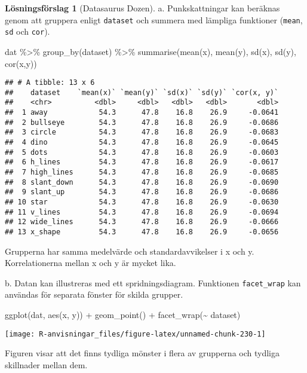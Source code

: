 \documentclass[
]{book}
\newenvironment{Shaded}{\begin{snugshade}}{\end{snugshade}}
\newcommand{\FunctionTok}[1]{\textcolor[rgb]{0.00,0.00,0.00}{#1}}
\newcommand{\NormalTok}[1]{#1}
\newcommand{\SpecialCharTok}[1]{\textcolor[rgb]{0.00,0.00,0.00}{#1}}
\theoremstyle{definition}
\theoremstyle{definition}
\theoremstyle{definition}
\theoremstyle{definition}
\newtheorem{hypothesis}{Lösningsförslag}[chapter]
\theoremstyle{remark}
\begin{document}
\begin{hypothesis}[Datasaurus Dozen]
a. Punkskattningar kan beräknas genom att gruppera enligt \texttt{dataset} och summera med lämpliga funktioner (\texttt{mean}, \texttt{sd} och \texttt{cor}).

\begin{Shaded}
\begin{Highlighting}[]
\NormalTok{dat }\SpecialCharTok{\%\textgreater{}\%}
  \FunctionTok{group\_by}\NormalTok{(dataset) }\SpecialCharTok{\%\textgreater{}\%} 
  \FunctionTok{summarise}\NormalTok{(}\FunctionTok{mean}\NormalTok{(x), }\FunctionTok{mean}\NormalTok{(y), }\FunctionTok{sd}\NormalTok{(x), }\FunctionTok{sd}\NormalTok{(y), }\FunctionTok{cor}\NormalTok{(x,y))}
\end{Highlighting}
\end{Shaded}

\begin{verbatim}
## # A tibble: 13 x 6
##    dataset    `mean(x)` `mean(y)` `sd(x)` `sd(y)` `cor(x, y)`
##    <chr>          <dbl>     <dbl>   <dbl>   <dbl>       <dbl>
##  1 away            54.3      47.8    16.8    26.9     -0.0641
##  2 bullseye        54.3      47.8    16.8    26.9     -0.0686
##  3 circle          54.3      47.8    16.8    26.9     -0.0683
##  4 dino            54.3      47.8    16.8    26.9     -0.0645
##  5 dots            54.3      47.8    16.8    26.9     -0.0603
##  6 h_lines         54.3      47.8    16.8    26.9     -0.0617
##  7 high_lines      54.3      47.8    16.8    26.9     -0.0685
##  8 slant_down      54.3      47.8    16.8    26.9     -0.0690
##  9 slant_up        54.3      47.8    16.8    26.9     -0.0686
## 10 star            54.3      47.8    16.8    26.9     -0.0630
## 11 v_lines         54.3      47.8    16.8    26.9     -0.0694
## 12 wide_lines      54.3      47.8    16.8    26.9     -0.0666
## 13 x_shape         54.3      47.8    16.8    26.9     -0.0656
\end{verbatim}

Grupperna har samma medelvärde och standardavvikelser i x och y. Korrelationerna mellan x och y är mycket lika.

b. Datan kan illustreras med ett spridningsdiagram. Funktionen \texttt{facet\_wrap} kan användas för separata fönster för skilda grupper.

\begin{Shaded}
\begin{Highlighting}[]
\FunctionTok{ggplot}\NormalTok{(dat, }\FunctionTok{aes}\NormalTok{(x, y)) }\SpecialCharTok{+}
  \FunctionTok{geom\_point}\NormalTok{() }\SpecialCharTok{+}
  \FunctionTok{facet\_wrap}\NormalTok{(}\SpecialCharTok{\textasciitilde{}}\NormalTok{ dataset)}
\end{Highlighting}
\end{Shaded}

\begin{center}\texttt{[image: R-anvisningar\_files/figure-latex/unnamed-chunk-230-1]} \end{center}

Figuren visar att det finns tydliga mönster i flera av grupperna och tydliga skillnader mellan dem.
\end{hypothesis}
\end{document}
